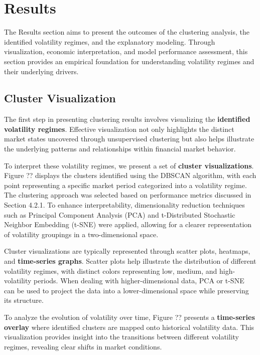 \chapter{Results}

The Results section aims to present the outcomes of the clustering analysis, the identified volatility regimes, and the explanatory modeling. Through visualization, economic interpretation, and model performance assessment, this section provides an empirical foundation for understanding volatility regimes and their underlying drivers.

\section{Cluster Visualization}

The first step in presenting clustering results involves visualizing the \textbf{identified volatility regimes}. Effective visualization not only highlights the distinct market states uncovered through unsupervised clustering but also helps illustrate the underlying patterns and relationships within financial market behavior.

To interpret these volatility regimes, we present a set of \textbf{cluster visualizations}. Figure ?? displays the clusters identified using the DBSCAN algorithm, with each point representing a specific market period categorized into a volatility regime. The clustering approach was selected based on performance metrics discussed in Section 4.2.1. To enhance interpretability, dimensionality reduction techniques such as Principal Component Analysis (PCA) and t-Distributed Stochastic Neighbor Embedding (t-SNE) were applied, allowing for a clearer representation of volatility groupings in a two-dimensional space.

Cluster visualizations are typically represented through scatter plots, heatmaps, and \textbf{time-series graphs}. Scatter plots help illustrate the distribution of different volatility regimes, with distinct colors representing low, medium, and high-volatility periods. When dealing with higher-dimensional data, PCA or t-SNE can be used to project the data into a lower-dimensional space while preserving its structure.

To analyze the evolution of volatility over time, Figure ?? presents a \textbf{time-series overlay} where identified clusters are mapped onto historical volatility data. This visualization provides insight into the transitions between different volatility regimes, revealing clear shifts in market conditions.

